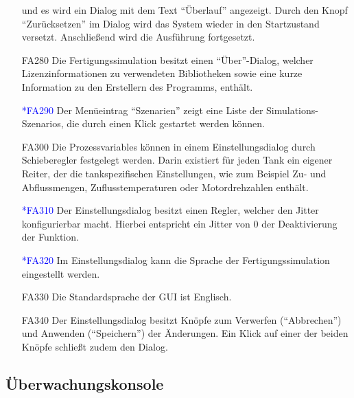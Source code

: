 \documentclass[parskip=full]{scrartcl}
\begin{document}
\begin{enumerate}
  und es wird ein Dialog mit dem Text "`\"Uberlauf"' angezeigt. Durch den Knopf "`Zur\"ucksetzen"' im Dialog wird das System wieder in den Startzustand versetzt.
  Anschlie{\ss}end wird die Ausführung fortgesetzt.
  \item[FA280] Die \gls{Fertigungssimulation} besitzt einen "`Über"'-Dialog, welcher Lizenzinformationen zu verwendeten Bibliotheken
    sowie eine kurze Information zu den Erstellern des Programms, enthält.
  \item[\textcolor{blue}{*FA290}] Der Menüeintrag "`Szenarien"' zeigt eine Liste der \glspl{Simulations-Szenario}, die durch einen Klick gestartet werden können.
  \item[FA300] Die \glspl{Prozessvariable} können in einem Einstellungsdialog durch Schieberegler festgelegt werden. Darin existiert für jeden Tank ein eigener Reiter, der die
    tankspezifischen Einstellungen, wie zum Beispiel Zu- und Abflussmengen, Zuflusstemperaturen oder Motordrehzahlen enthält.
  \item[\textcolor{blue}{*FA310}] Der Einstellungsdialog besitzt einen Regler, welcher den \gls{Jitter} konfigurierbar macht.
    Hierbei entspricht ein \gls{Jitter} von 0 der Deaktivierung der Funktion.
  \item[\textcolor{blue}{*FA320}] Im Einstellungsdialog kann die Sprache der \gls{Fertigungssimulation} eingestellt werden.
  \item[FA330] Die Standardsprache der \gls{GUI} ist Englisch.
  \item[FA340] Der Einstellungsdialog besitzt Knöpfe zum Verwerfen ("`Abbrechen"') und Anwenden ("`Speichern"') der Änderungen. Ein Klick auf einer der beiden Knöpfe schließt zudem den Dialog.
\end{enumerate}

\subsection{Überwachungskonsole}
\end{document}
